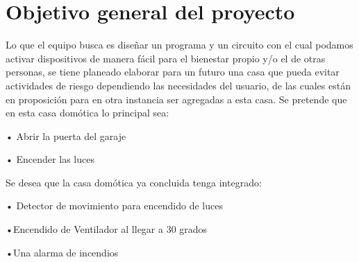 \documentclass[12pt,a4paper]{article}
\begin{document}
\section{Objetivo general del proyecto}
Lo que el equipo busca es diseñar un programa y un circuito con el cual podamos activar dispositivos de manera fácil para el bienestar propio y/o el de otras personas, se tiene planeado elaborar para un futuro una casa que pueda evitar actividades de riesgo dependiendo las necesidades del usuario, de las cuales están en proposición para en otra instancia ser agregadas a esta casa.
Se pretende que en esta casa domótica lo principal sea:
\begin{center}
•	  Abrir la puerta del garaje 
\end{center}
\begin{center}
•	Encender las luces
\end{center}
Se desea que la casa domótica ya concluida tenga integrado:\begin{center}
•	Detector de movimiento para encendido de luces 
\end{center}
\begin{center}
•Encendido de Ventilador al llegar a 30 grados
\end{center}
\begin{center}
•Una alarma de incendios 
\end{center}
\end{document}
